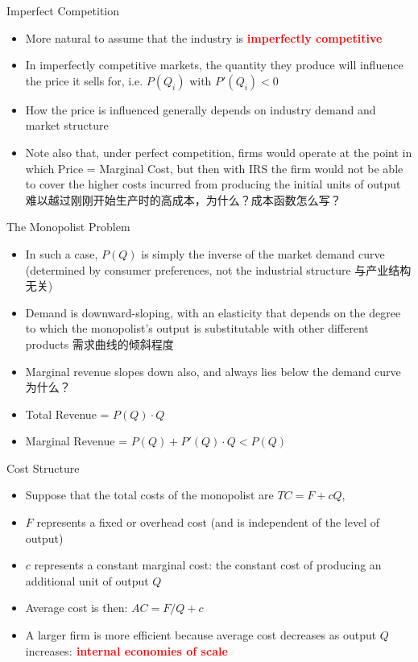 \documentclass[10pt,hyperref={CJKbookmarks=true},xcolor=dvipsnames,aspectratio=169]{beamer}
\begin{document}
\begin{frame}{Imperfect Competition }

\begin{itemize}
\item More natural to assume that the industry is \textbf{\textcolor{red}{imperfectly
competitive}}
\item In imperfectly competitive markets, the quantity they produce will
influence the price it sells for, i.e. $P(Q_{i})$ with $P\prime(Q_{i})<0$ 
\item How the price is influenced generally depends on industry demand and
market structure 
\item Note also that, under perfect competition, firms would operate at
the point in which Price = Marginal Cost, but then with IRS the firm
would not be able to cover the higher costs incurred from producing
the initial units of output 难以越过刚刚开始生产时的高成本，为什么？成本函数怎么写？
\end{itemize}
\end{frame}

\begin{frame}{The Monopolist Problem}

\begin{itemize}
\item In such a case, $P(Q)$ is simply the inverse of the market demand
curve (determined by consumer preferences, not the industrial structure
与产业结构无关) 
\item Demand is downward-sloping, with an elasticity that depends on the
degree to which the monopolist’s output is substitutable with other
different products 需求曲线的倾斜程度
\item Marginal revenue slopes down also, and always lies below the demand
curve 为什么？
\item Total Revenue = $P(Q)\cdot Q$
\item Marginal Revenue = $P(Q)+P\prime(Q)\cdot Q<P(Q)$ 
\end{itemize}
\end{frame}

\begin{frame}{Cost Structure }

\begin{itemize}
\item Suppose that the total costs of the monopolist are $TC=F+cQ$, 
\item $F$ represents a fixed or overhead cost (and is independent of the
level of output) 
\item $c$ represents a constant marginal cost: the constant cost of producing
an additional unit of output $Q$ 
\item Average cost is then: $AC=F/Q+c$ 
\item A larger firm is more efficient because average cost decreases as
output $Q$ increases:\textbf{\textcolor{red}{{} internal economies
of scale}}
\end{itemize}
\end{frame}
\end{document}
